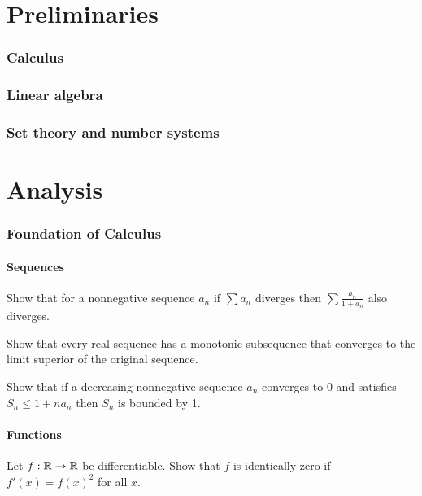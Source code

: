 \documentclass[11pt]{article}
\begin{document}
\tableofcontents

\newpage
\part*{Preliminaries}
\section{Calculus}
\section{Linear algebra}
\section{Set theory and number systems}




\newpage
\part{Analysis}
\setcounter{section}{0}

\section{Foundation of Calculus}
	\subsection{Sequences}
	\begin{prb}
	Show that for a nonnegative sequence $a_n$ if $\sum a_n$ diverges then $\sum\frac{a_n}{1+a_n}$ also diverges.
	\end{prb}

	\begin{prb}
	Show that every real sequence has a monotonic subsequence that converges to the limit superior of the original sequence.
	\end{prb}

	\begin{prb}
	Show that if a decreasing nonnegative sequence $a_n$ converges to 0 and satisfies $S_n\le1+na_n$ then $S_n$ is bounded by 1.
	\end{prb}

	\subsection{Functions}
	\begin{prb}
	Let $f:\mathbb{R}\to\mathbb{R}$ be differentiable.
	Show that $f$ is identically zero if $f'(x)=f(x)^2$ for all $x$.
	\end{prb}
\end{document}
